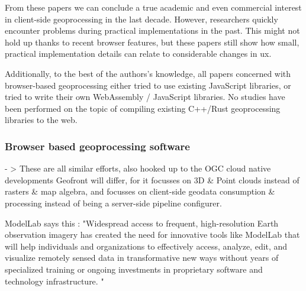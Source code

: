 
From these papers we can conclude a true academic and even commercial interest in client-side geoprocessing in the last decade. However, researchers quickly encounter problems during practical implementations in the past. This might not hold up thanks to recent browser features, but these papers still show how small, practical implementation details can relate to considerable changes in \ac{ux}. 

Additionally, to the best of the authors's knowledge, all papers concerned with browser-based geoprocessing either tried to use existing JavaScript libraries, or tried to write their own WebAssembly / JavaScript libraries. No studies have been performed on the topic of compiling existing C++/Rust geoprocessing libraries to the web. 




\subsubsection*{Browser based geoprocessing software}

- >
These are all similar efforts, also hooked up to the OGC cloud native developments
Geofront will differ, for it focusses on 3D \& Point clouds instead of rasters \& map algebra, and focusses on client-side geodata consumption \& processing instead of being a server-side pipeline configurer.

ModelLab says this : "Widespread access to frequent, high-resolution Earth observation imagery has created the need for innovative tools like ModelLab that will help individuals and organizations to effectively access, analyze, edit, and visualize remotely sensed data in transformative new ways without years of specialized training or ongoing investments in proprietary software and technology infrastructure. "


